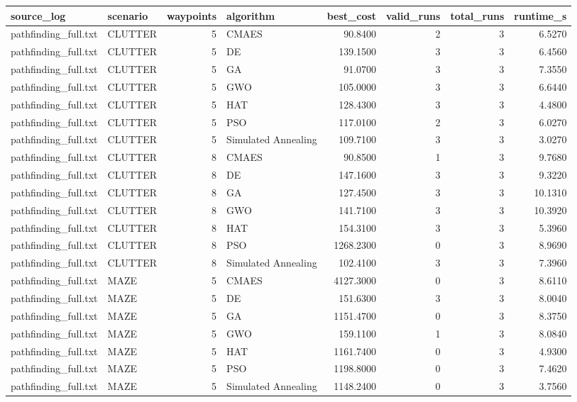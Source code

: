 \begin{tabular}{llrlrrrr}
\toprule
source_log & scenario & waypoints & algorithm & best_cost & valid_runs & total_runs & runtime_s \\
\midrule
pathfinding_full.txt & CLUTTER & 5 & CMAES & 90.8400 & 2 & 3 & 6.5270 \\
pathfinding_full.txt & CLUTTER & 5 & DE & 139.1500 & 3 & 3 & 6.4560 \\
pathfinding_full.txt & CLUTTER & 5 & GA & 91.0700 & 3 & 3 & 7.3550 \\
pathfinding_full.txt & CLUTTER & 5 & GWO & 105.0000 & 3 & 3 & 6.6440 \\
pathfinding_full.txt & CLUTTER & 5 & HAT & 128.4300 & 3 & 3 & 4.4800 \\
pathfinding_full.txt & CLUTTER & 5 & PSO & 117.0100 & 2 & 3 & 6.0270 \\
pathfinding_full.txt & CLUTTER & 5 & Simulated Annealing & 109.7100 & 3 & 3 & 3.0270 \\
pathfinding_full.txt & CLUTTER & 8 & CMAES & 90.8500 & 1 & 3 & 9.7680 \\
pathfinding_full.txt & CLUTTER & 8 & DE & 147.1600 & 3 & 3 & 9.3220 \\
pathfinding_full.txt & CLUTTER & 8 & GA & 127.4500 & 3 & 3 & 10.1310 \\
pathfinding_full.txt & CLUTTER & 8 & GWO & 141.7100 & 3 & 3 & 10.3920 \\
pathfinding_full.txt & CLUTTER & 8 & HAT & 154.3100 & 3 & 3 & 5.3960 \\
pathfinding_full.txt & CLUTTER & 8 & PSO & 1268.2300 & 0 & 3 & 8.9690 \\
pathfinding_full.txt & CLUTTER & 8 & Simulated Annealing & 102.4100 & 3 & 3 & 7.3960 \\
pathfinding_full.txt & MAZE & 5 & CMAES & 4127.3000 & 0 & 3 & 8.6110 \\
pathfinding_full.txt & MAZE & 5 & DE & 151.6300 & 3 & 3 & 8.0040 \\
pathfinding_full.txt & MAZE & 5 & GA & 1151.4700 & 0 & 3 & 8.3750 \\
pathfinding_full.txt & MAZE & 5 & GWO & 159.1100 & 1 & 3 & 8.0840 \\
pathfinding_full.txt & MAZE & 5 & HAT & 1161.7400 & 0 & 3 & 4.9300 \\
pathfinding_full.txt & MAZE & 5 & PSO & 1198.8000 & 0 & 3 & 7.4620 \\
pathfinding_full.txt & MAZE & 5 & Simulated Annealing & 1148.2400 & 0 & 3 & 3.7560 \\

\end{tabular}
